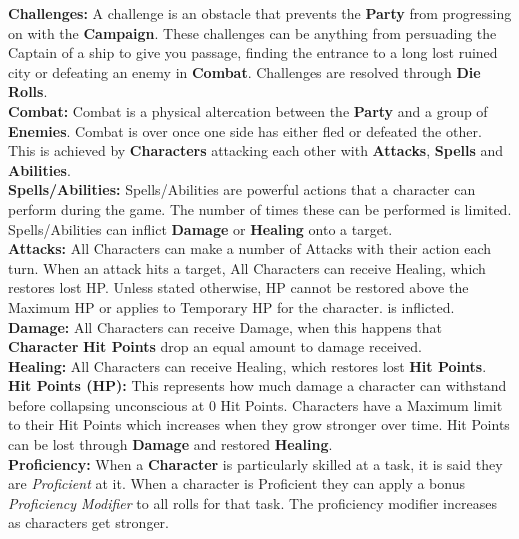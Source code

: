 \documentclass[progress]{cmpreport}
\begin{document}
	\textbf{Challenges:} A challenge is an obstacle that prevents the \textbf{Party} from progressing on with the \textbf{Campaign}. These challenges can be anything from persuading the Captain of a ship to give you passage, finding the entrance to a long lost ruined city or defeating an enemy in \textbf{Combat}. Challenges are resolved through \textbf{Die Rolls}. \\
	
	\textbf{Combat:} Combat is a physical altercation between the \textbf{Party} and a group of \textbf{Enemies}. Combat is over once one side has either fled or defeated the other. This is achieved by \textbf{Characters} attacking each other with \textbf{Attacks}, \textbf{Spells} and \textbf{Abilities}. \\
	
	\textbf{Spells/Abilities:} 	Spells/Abilities are powerful actions that a character can perform during the game. The number of times these can be performed is limited. Spells/Abilities can inflict \textbf{Damage} or \textbf{Healing} onto a target. \\
	
	\textbf{Attacks:} All Characters can make a number of Attacks with their action each turn. When an attack hits a target, All Characters can receive Healing, which restores lost HP. Unless stated otherwise, HP cannot be restored above the Maximum HP or applies to Temporary HP for the character. is inflicted. \\
	
	\textbf{Damage:} All Characters can receive Damage, when this happens that \textbf{Character} \textbf{Hit Points} drop an equal amount to damage received.\\
	
	\textbf{Healing:} All Characters can receive Healing, which restores lost \textbf{Hit Points}. \\
	
	\textbf{Hit Points (HP):} This represents how much damage a character can withstand before collapsing unconscious at 0 Hit Points. Characters have a Maximum limit to their Hit Points which increases when they grow stronger over time. Hit Points can be lost through \textbf{Damage} and restored \textbf{Healing}. \\
	
	\textbf{Proficiency:} When a \textbf{Character} is particularly skilled at a task, it is said they are \textit{Proficient} at it. When a character is Proficient they can apply a bonus \textit{Proficiency Modifier} to all rolls for that task. The proficiency modifier increases as characters get stronger. \\
	
\end{document}
